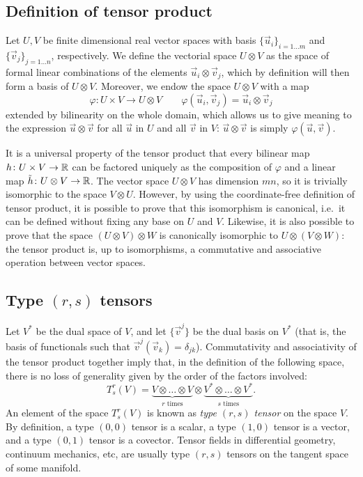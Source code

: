 \subsection*{Definition of tensor product}

Let $U,V$ be finite dimensional real vector spaces with basis
$\{\vec{u}_i\}_{i = 1 \ldots m}$ and $\{\vec{v}_j\}_{j = 1 \ldots n}$, respectively.
We define the vectorial space $U \otimes V$ as the space of formal
linear combinations of the elements $\vec{u}_i \otimes \vec{v}_j$,
which by definition will then form a basis of $U \otimes V$.
Moreover, we endow the space $U \otimes V$ with a map
\[
\varphi \colon U \times V \to U \otimes V
\qquad
\varphi(\vec{u}_i,\vec{v}_j) = \vec{u}_i \otimes \vec{v}_j
\]
extended by bilinearity on the whole domain,
which allows us to give meaning to the expression $\vec{u} \otimes \vec{v}$
for all $\vec{u}$ in $U$ and all $\vec{v}$ in $V$: $\vec{u} \otimes \vec{v}$
is simply $\varphi(\vec{u},\vec{v})$.

It is a universal property of the tensor product that every bilinear map
$h \colon U \times V \to \mathbb{R}$ can be factored uniquely as the composition of
$\varphi$ and a linear map $\tilde{h} \colon U \otimes V \to \mathbb{R}$.
The vector space $U \otimes V$ has dimension $mn$, so it is trivially isomorphic
to the space $V \otimes U$. However, by using the coordinate-free definition
of tensor product, it is possible to prove that this isomorphism is canonical,
i.e.\ it can be defined without fixing any base on $U$ and $V$.
Likewise, it is also possible to prove that the space $(U \otimes V) \otimes W$
is canonically isomorphic to $U \otimes (V \otimes W)$: the tensor
product is, up to isomorphisms, a commutative and associative operation
between vector spaces.

\subsection*{Type $(r,s)$ tensors}

Let $V^*$ be the dual space of $V$, and let $\{\vec{v}^j\}$ be the dual basis
on $V^*$ (that is, the basis of functionals such that
$\vec{v}^j(\vec{v}_k) = \delta_{jk}$).
Commutativity and associativity of the tensor product together imply that,
in the definition of the following space, there is no loss of generality
given by the order of the factors involved:
\[
T^r_s(V) = \underbrace{V \otimes \dots \otimes V}_{\text{$r$ times}}
\otimes
\underbrace{V^* \otimes \dots \otimes V^*}_{\text{$s$ times}}.
\]
An element of the space $T_s^r(V)$ is known as \emph{type $(r,s)$ tensor}
on the space $V$. By definition, a type $(0,0)$ tensor is a scalar,
a type $(1,0)$ tensor is a vector, and a type $(0,1)$ tensor is a covector.
Tensor fields in differential geometry, continuum mechanics,
etc, are usually type $(r,s)$ tensors on the tangent space of some manifold.

